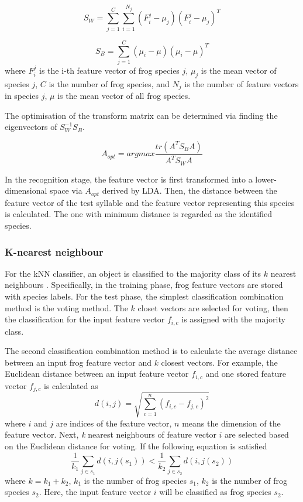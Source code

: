 \begin{equation}
S_{W}=\sum_{j=1}^{C}\sum_{i=1}^{N_{j}}(F_{i}^{j}-\mu_{j})(F_{i}^{j}-\mu_{j})^{T}
\end{equation}

\begin{equation}
S_{B}=\sum_{j=1}^{C}(\mu_{i}-\mu)(\mu_{i}-\mu)^{T}
\end{equation}
where $F_{i}^{j}$ is the i-th feature vector of frog species $j$, $\mu_{j}$ is the mean vector of species $j$, $C$ is the number of frog species, and $N_{j}$ is the number of feature vectors in species $j$, $\mu$ is the mean vector of all frog species.

The optimisation of the transform matrix can be determined via finding the eigenvectors of $S_{W}^{-1}S_{B}$.

\begin{equation}
A_{opt}= argmax \frac{tr(A^{T}S_{B}A)}{A^{T}S_{W}A}
\end{equation}

In the recognition stage, the feature vector is first transformed into a lower-dimensional space via $A_{opt}$ derived by LDA. Then, the distance between the feature vector of the test syllable and the feature vector representing this species is calculated. The one with minimum distance is regarded as the identified species.

\subsubsection{K-nearest neighbour}
For the kNN classifier, an object is classified to the majority class of its $k$ nearest neighbours \citep{huang2009frog}. Specifically, in the training phase, frog feature vectors are stored with species labels. For the test phase, the simplest classification combination method is the voting method. The $k$ closet vectors are selected for voting, then the classification for the input feature vector $f_{i,c}$ is assigned with the majority class.

The second classification combination method is to calculate the average distance between an input frog feature vector and $k$ closest vectors. For example, the Euclidean distance between an input feature vector $f_{i,c}$ and one stored feature vector $f_{j,c}$ is calculated as
\begin{equation}
d(i,j) = \sqrt{\sum_{c=1}^{n}(f_{i,c}-f_{j,c})^2}
\end{equation}
\noindent where $i$ and $j$ are indices of the feature vector, $n$ means the dimension of the feature vector. Next, \textit{k} nearest neighbours of feature vector $i$ are selected based on the Euclidean distance for voting. If the following equation is satisfied
\begin{equation}
\frac{1}{k_{1}}\sum_{j \in s_{1}} d(i,j(s_{1})) < \frac{1}{k_{2}}\sum_{j \in s_{2}}d(i,j(s_{2})) 
\end{equation}
\noindent where $k=k_{1}+k_{2}$, $k_{1}$ is the number of frog species $s_{1}$, $k_{2}$ is the number of frog species $s_{2}$. Here, the input feature vector $i$ will be classified as frog species $s_{2}$.

